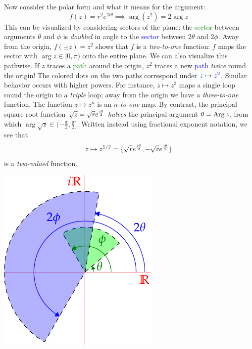 \begin{examples}{}{}
\begin{minipage}[t]{0.67\linewidth}\vspace{0pt}
Now consider the polar form and what it means for the argument:
\[f(z)=r^2e^{2i\theta}\implies \arg(z^2)=2\arg z\]
This can be visualized by considering sectors of the plane: the \textcolor{Green}{sector} between arguments $\theta$ and $\phi$ is \emph{doubled} in angle to the \textcolor{blue}{sector} between $2\theta$ and $2\phi$.\smallbreak
Away from the origin, $f(\pm z)=z^2$ shows that $f$ is a \emph{two-to-one} function: $f$ maps the sector with $\arg z\in[0,\pi)$ onto the entire plane.\smallbreak
We can also visualize this pathwise. If $z$ traces a \textcolor{Green}{path} around the origin, $z^2$ traces a new \textcolor{blue}{path} \emph{twice} round the origin! The colored dots on the two paths correspond under $\textcolor{Green}{z}\mapsto \textcolor{blue}{z^2}$.\smallbreak
Similar behavior occurs with higher powers. For instance, $z\mapsto z^3$ maps a single loop round the origin to a \emph{triple} loop; away from the origin we have a \emph{three-to-one} function. The function $z\mapsto z^n$ is an \emph{$n$-to-one} map.\smallbreak
By contrast, the principal square root function $\sqrt z=\sqrt re^{\frac{i\theta}{2}}$ \emph{halves} the principal argument $\theta=\operatorname{Arg} z$, from which $\arg\sqrt z\in (-\frac\pi 2,\frac\pi 2]$. Written instead using fractional exponent notation, we see that
\[z\mapsto z^{1/2}=\{\sqrt re^{\frac{i\theta}{2}},-\sqrt re^{\frac{i\theta}{2}}\}\]
is a \emph{two-valued} function.
\end{minipage}\begin{minipage}[t]{0.33\linewidth}\vspace{0pt}
\flushright\includegraphics{functions-zsq2}\\

\end{minipage}
\end{examples}
